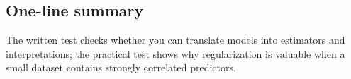 ﻿\documentclass[11pt]{article}
\begin{document}
\subsection{One-line summary}

The written test checks whether you can translate models into estimators and
interpretations; the practical test shows why regularization is valuable when a
small dataset contains strongly correlated predictors.
\end{document}
